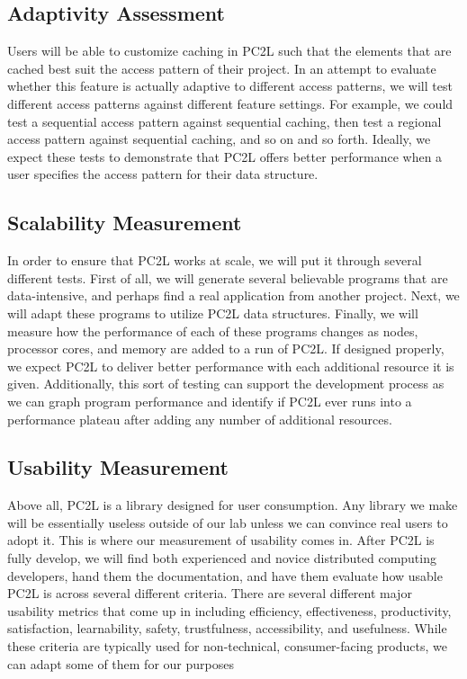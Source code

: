 \subsection{Adaptivity Assessment}
Users will be able to customize  caching in PC2L such that the elements that are cached best suit the access pattern of their project. In an attempt to evaluate whether this feature is actually adaptive to different access patterns, we will test different access patterns against different feature settings. For example, we could test a sequential access pattern against sequential caching, then test a regional access pattern against sequential caching, and so on and so forth. Ideally, we expect these tests to demonstrate that PC2L offers better performance when a user specifies the access pattern for their data structure. 

\subsection{Scalability Measurement}
In order to ensure that PC2L works at scale, we will put it through several different tests. First of all, we will generate several believable programs that are data-intensive, and perhaps find a real application from another project. Next, we will adapt these programs to utilize PC2L data structures. Finally, we will measure how the performance of each of these programs changes as nodes, processor cores, and memory are added to a run of PC2L. If designed properly, we expect PC2L to deliver better performance with each additional resource it is given. Additionally, this sort of testing can support the development process as we can graph program performance and identify if PC2L ever runs into a performance plateau after adding any number of additional resources.

\subsection{Usability Measurement}
Above all, PC2L is a library designed for user consumption. Any library we make will be essentially useless outside of our lab unless we can convince real users to adopt it. This is where our measurement of usability comes in. After PC2L is fully develop, we will find both experienced and novice distributed computing developers, hand them the documentation, and have them evaluate how usable PC2L is across several different criteria. There are several different major usability metrics that come up in \cite{use} including efficiency, effectiveness, productivity, satisfaction, learnability, safety, trustfulness, accessibility, and usefulness. While these criteria are typically used for non-technical, consumer-facing products, we can adapt some of them for our purposes


